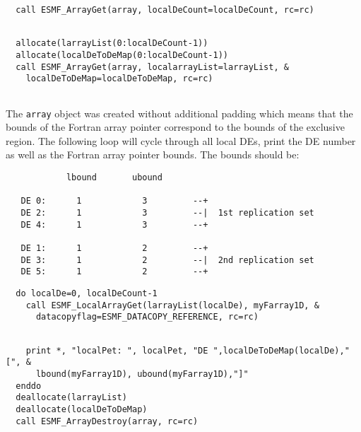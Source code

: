  \begin{verbatim}
  call ESMF_ArrayGet(array, localDeCount=localDeCount, rc=rc)
 
\end{verbatim}
 

 \begin{verbatim}
  allocate(larrayList(0:localDeCount-1))
  allocate(localDeToDeMap(0:localDeCount-1))
  call ESMF_ArrayGet(array, localarrayList=larrayList, &
    localDeToDeMap=localDeToDeMap, rc=rc)
 
\end{verbatim}
 

   The {\tt array} object was created without additional padding which means
   that the bounds of the Fortran array pointer correspond to the bounds of
   the exclusive region. The following loop will cycle through all local DEs, 
   print the DE number as well as the Fortran array pointer bounds. The bounds
   should be:
   \begin{verbatim}
            lbound       ubound
  
   DE 0:      1            3         --+
   DE 2:      1            3         --|  1st replication set
   DE 4:      1            3         --+
  
   DE 1:      1            2         --+
   DE 3:      1            2         --|  2nd replication set
   DE 5:      1            2         --+
   \end{verbatim} 

 \begin{verbatim}
  do localDe=0, localDeCount-1
    call ESMF_LocalArrayGet(larrayList(localDe), myFarray1D, &
      datacopyflag=ESMF_DATACOPY_REFERENCE, rc=rc)
 
\end{verbatim}
 

 \begin{verbatim}
    print *, "localPet: ", localPet, "DE ",localDeToDeMap(localDe)," [", &
      lbound(myFarray1D), ubound(myFarray1D),"]"
  enddo
  deallocate(larrayList)
  deallocate(localDeToDeMap)
  call ESMF_ArrayDestroy(array, rc=rc)
 
\end{verbatim}
 
